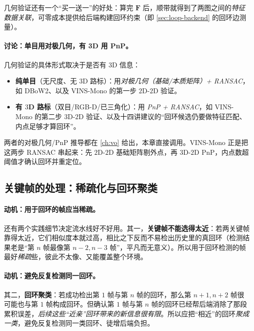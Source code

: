 \noindent 几何验证还有一个“买一送一”的好处\cite{galvez2012bags}：算完 $\mathbf F$ 后，顺带就得到了两图之间的\emph{特征数据关联}，可零成本提供给后端构建回环约束（即 \cref{sec:loop-backend} 的回环边测量）。

\paragraph{讨论：单目用对极几何，有 3D 用 PnP。}
几何验证的具体形式取决于是否有 $3$D 信息\cite{gaoxiang2019slam14}：
\begin{itemize}
  \item \textbf{纯单目}（无尺度、无 $3$D 路标）：用\emph{对极几何（基础/本质矩阵）+ RANSAC}，如 DBoW2、以及 VINS-Mono 的第一步 $2$D-$2$D 验证\cite{qin2018vins}。
  \item \textbf{有 $3$D 路标}（双目/RGB-D/已三角化）：用 \emph{PnP + RANSAC}，如 VINS-Mono 的第二步 $3$D-$2$D 验证、以及十四讲建议的“回环候选仍要做特征匹配、内点足够才算回环”。
\end{itemize}
两者的对极几何/PnP 推导都在 \cref{ch:vo} 给出，本章直接调用。VINS-Mono 正是把这两步 RANSAC 串起来：先 $2$D-$2$D 基础矩阵剔外点，再 $3$D-$2$D PnP，内点数超阈值才确认回环并重定位\cite{qin2018vins}。

\subsection{关键帧的处理：稀疏化与回环聚类}
\label{sec:loop-keyframe}

\paragraph{动机：用于回环的帧应当稀疏。}
还有两个实践细节决定流水线好不好用\cite{gaoxiang2019slam14}。其一，\textbf{关键帧不能选得太近}：若两关键帧靠得太近，它们相似度本就过高，相比之下反而不易检出历史里的真回环（检测结果老是“第 $n$ 帧最像第 $n-2,n-3$ 帧”，平凡而无意义）。所以用于回环检测的帧最好\emph{稀疏}些，彼此不太像、又能覆盖整个环境。

\paragraph{动机：避免反复检测同一回环。}
其二，\textbf{回环聚类}：若成功检出第 $1$ 帧与第 $n$ 帧的回环，那么第 $n+1,n+2$ 帧很可能也与第 $1$ 帧构成回环。但确认第 $1$ 帧与第 $n$ 帧的回环已经帮后端消除了那段累积误差，\emph{后续这些“近亲”回环带来的新信息很有限}。所以应把“相近”的回环\emph{聚成一类}，避免反复检测同一类回环、徒增后端负担\cite{gaoxiang2019slam14}。

